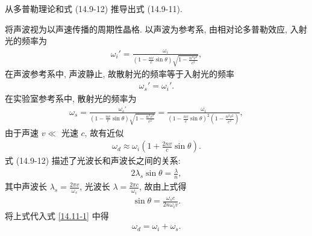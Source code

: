 \documentclass{note}
\begin{document}
\begin{exe}
    从多普勒理论和式 (14.9-12) 推导出式 (14.9-11).
\end{exe}
\begin{pf}
    将声波视为以声速传播的周期性晶格.
    以声波为参考系, 由相对论多普勒效应, 入射光的频率为
    \begin{align}
        \omega_i'=\frac{\omega_i}{\left(1-\frac{nv}{c}\sin\theta\right)\sqrt{1-\frac{n^2v^2}{c^2}}},
    \end{align}
    在声波参考系中, 声波静止, 故散射光的频率等于入射光的频率
    \begin{align}
        \omega_s'=\omega_i'.
    \end{align}
    在实验室参考系中, 散射光的频率为
    \begin{align}
        \omega_s=\frac{\omega_s'}{\left(1-\frac{nv}{c}\sin\theta\right)\sqrt{1-\frac{n^2v^2}{c^2}}}=\frac{\omega_i}{\left(1-\frac{nv}{c}\sin\theta\right)^2\left(1-\frac{n^2v^2}{c^2}\right)},
    \end{align}
    由于声速 $v\ll$ 光速 $c$, 故有近似
    \begin{align}
        \label{14.11-1}
        \omega_d\approx\omega_i\left(1+\frac{2nv}{c}\sin\theta\right).
    \end{align}
    式 (14.9-12) 描述了光波长和声波长之间的关系:
    \begin{align}
        2\lambda_s\sin\theta=\frac{\lambda}{n},
    \end{align}
    其中声波长 $\lambda_s=\frac{2\pi v}{\omega_s}$, 光波长 $\lambda=\frac{2\pi c}{\omega_i}$, 故由上式得
    \begin{align}
        \sin\theta=\frac{\omega_sc}{2n\omega_iv}.
    \end{align}
    将上式代入式 \eqref{14.11-1} 中得
    \begin{align}
        \omega_d=\omega_i+\omega_s.
    \end{align}
\end{pf}
\ifx\allfiles\undefined
\end{document}

